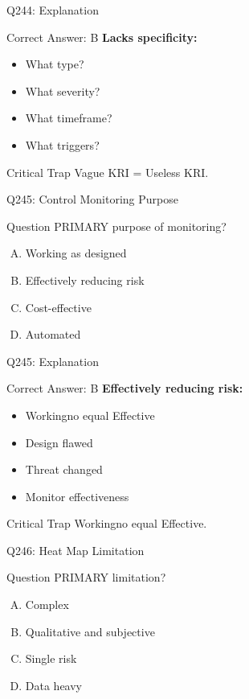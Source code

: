 \documentclass{beamer}
\begin{document}
	\begin{frame}{Q244: Explanation}
		\begin{block}{Correct Answer: B}
			\textbf{Lacks specificity:}
			\begin{itemize}
				\item What type?
				\item What severity?
				\item What timeframe?
				\item What triggers?
			\end{itemize}
		\end{block}
		\begin{alertblock}{Critical Trap}
			Vague KRI = Useless KRI.
		\end{alertblock}
	\end{frame}
	
	\begin{frame}{Q245: Control Monitoring Purpose}
		\begin{block}{Question}
			PRIMARY purpose of monitoring?
		\end{block}
		\begin{enumerate}[(A)]
			\item Working as designed
			\item Effectively reducing risk
			\item Cost-effective
			\item Automated
		\end{enumerate}
	\end{frame}
	
	\begin{frame}{Q245: Explanation}
		\begin{block}{Correct Answer: B}
			\textbf{Effectively reducing risk:}
			\begin{itemize}
				\item Workingno equal Effective
				\item Design flawed
				\item Threat changed
				\item Monitor effectiveness
			\end{itemize}
		\end{block}
		\begin{alertblock}{Critical Trap}
			Workingno equal Effective.
		\end{alertblock}
	\end{frame}
	
	\begin{frame}{Q246: Heat Map Limitation}
		\begin{block}{Question}
			PRIMARY limitation?
		\end{block}
		\begin{enumerate}[(A)]
			\item Complex
			\item Qualitative and subjective
			\item Single risk
			\item Data heavy
		\end{enumerate}
	\end{frame}
	
\end{document}

